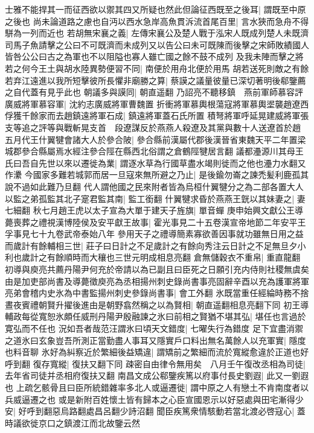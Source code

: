 士雅不能捍其一而征西欲以禦其四又所疑也然此但論征西既至之後耳|{
	謂既至中原之後也}
尚未論道路之慮也自沔以西水急岸高魚貫泝流首尾百里|{
	言水狹而急舟不得駢為一列而近也}
若胡無宋襄之義|{
	左傳宋襄公及楚人戰于泓宋人既成列楚人未既濟司馬子魚請擊之公曰不可既濟而未成列又以告公曰未可既陳而後擊之宋師敗績國人皆咎公公曰古之為軍也不以阻隘也寡人雖亡國之餘不鼓不成列}
及我未陣而擊之將若之何今王土與胡水陸異勢便習不同|{
	南便於用舟北便於用馬}
胡若送死則敵之有餘若弃江遠進以我所短擊彼所長懼非廟勝之算|{
	蔡謨之議量彼量已深切著明後郗鑒薦之自代蓋有見乎此也}
朝議多與謨同|{
	朝直遥翻}
乃詔亮不聽移鎮　燕前軍師慕容評廣威將軍慕容軍|{
	沈約志廣威將軍曹魏置}
折衝將軍慕輿根蕩寇將軍慕輿埿襲趙遼西俘獲千餘家而去趙鎮遠將軍石成|{
	鎮遠將軍蓋石氏所置}
積弩將軍呼延晃建威將軍張支等追之評等與戰斬晃支首　段遼謀反於燕燕人殺遼及其黨與數十人送遼首於趙　五月代王什翼犍會諸大人於參合陂|{
	參合縣前漢屬代郡後漢晉省東魏天平二年置梁城郡參合縣屬焉水經注參合陘在縣西北俗謂之倉鶴陘犍居言翻}
議都灅源川其母王氏曰吾自先世以來以遷徙為業|{
	謂逐水草為行國草盡水竭則徙而之他也灅力水翻又作㶟}
今國家多難若城郭而居一旦寇來無所避之乃止|{
	是後鍮勿崙之諫禿髪利鹿孤其說不過如此難乃旦翻}
代人謂他國之民來附者皆為烏桓什翼犍分之為二部各置大人以監之弟孤監其北子寔君監其南|{
	監工銜翻}
什翼犍求昏於燕燕王皝以其妹妻之|{
	妻七細翻}
秋七月趙王虎以太子宣為大單于建天子旌旗|{
	單音蟬}
庚申始興文獻公王導薨喪葬之禮視漢博陸侯及安平獻王故事|{
	霍光事見二十五卷漢宣帝地節二年安平王孚事見七十九卷武帝泰始八年}
參用天子之禮導簡素寡欲善因事就功雖無日用之益而歲計有餘輔相三世|{
	莊子曰日計之不足歲計之有餘向秀注云日計之不足無旦夕小利也歲計之有餘順時而大穰也三世元明成相息亮翻}
倉無儲穀衣不重帛|{
	重直龍翻}
初導與庾亮共薦丹陽尹何充於帝請以為已副且曰臣死之日願引充内侍則社稷無虞矣由是加吏部尚書及導薨徵庾亮為丞相揚州刺史錄尚書事亮固辭辛酉以充為護軍將軍亮弟會稽内史氷為中書監揚州刺史參錄尚書事|{
	會工外翻}
氷既當重任經綸時務不捨晝夜賓禮朝賢升擢後進由是朝野翕然稱之以為賢相|{
	朝直遥翻相息亮翻下同}
初王導輔政每從寬恕氷頗任威刑丹陽尹殷融諫之氷曰前相之賢猶不堪其弘|{
	堪任也言過於寛弘而不任也}
況如吾者哉范汪謂氷曰頃天文錯度|{
	七曜失行為錯度}
足下宜盡消禦之道氷曰玄象豈吾所測正當勤盡人事耳又隱實戶口料出無名萬餘人以充軍實|{
	隱度也料音聊}
氷好為糾察近於繁細後益矯違|{
	謂矯前之繁細而流於寬縱愈違於正道也好呼到翻}
復存寬縱|{
	復扶又翻下同}
疎密自由律令無用矣　八月壬午復改丞相為司徒|{
	去年省司徒并丞相府復扶又翻}
南昌文成公郗鑒疾篤以府事付長史劉遐|{
	此又一劉遐也}
上疏乞骸骨且曰臣所統錯雜率多北人或逼遷徙|{
	謂中原之人有戀土不肯南度者以兵威逼遷之也}
或是新附百姓懷土皆有歸本之心臣宣國恩示以好惡處與田宅漸得少安|{
	好呼到翻惡烏路翻處昌呂翻少詩沼翻}
聞臣疾篤衆情駭動若當北渡必啓寇心|{
	蓋時議欲徙京口之鎮渡江而北故鑒云然}
